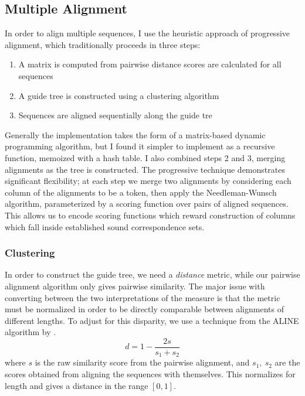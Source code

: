 \documentclass[doc,natbib,11pt]{apa6}
\begin{document}
\subsection{Multiple Alignment}

In order to align multiple sequences, I use the heuristic approach of progressive alignment, which traditionally proceeds in three steps: \begin{enumerate}
	\item A matrix is computed from pairwise distance scores are calculated for all sequences
	\item A guide tree is constructed using a clustering algorithm 
	\item Sequences are aligned sequentially along the guide tre
\end{enumerate}

Generally the implementation takes the form of a matrix-based dynamic programming algorithm, but I found it simpler to implement as a recursive function, memoized with a hash table. I also combined steps 2 and 3, merging alignments as the tree is constructed. The progressive technique demonstrates significant flexibility; at each step we merge two alignments by considering each column of the alignments to be a token, then apply the Needleman-Wunsch algorithm, parameterized by a scoring function over pairs of aligned sequences. This allows us to encode scoring functions which reward construction of columns which fall inside established sound correspondence sets. 

\subsubsection{Clustering}

In order to construct the guide tree, we need a \emph{distance} metric, while our pairwise alignment algorithm only gives pairwise similarity. The major issue with converting between the two interpretations of the measure is that the metric must be normalized in order to be directly comparable between alignments of different lengths. 
To adjust for this disparity, we use a technique from the ALINE algorithm by \citet{Downey2008}. 
\begin{equation}
d = 1- \frac{2s}{s_1+s_2}
\end{equation}
where $s$ is the raw similarity score from the pairwise alignment, and $s_1,\ s_2$ are the scores obtained from aligning the sequences with themselves. This normalizes for length and gives a distance in the range $[0,1]$. 
\end{document}
